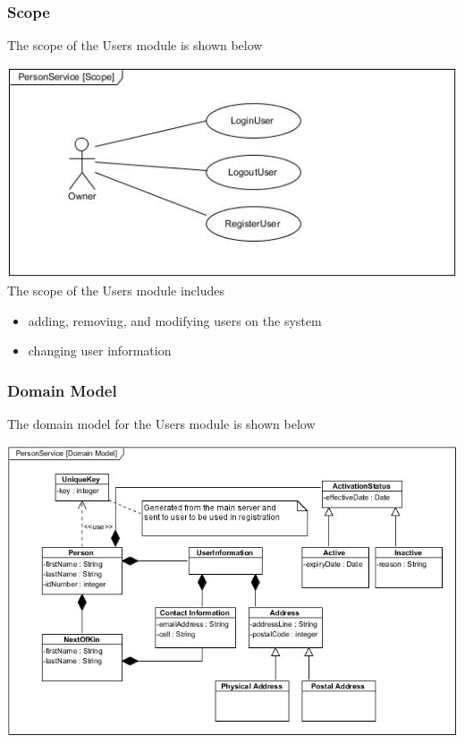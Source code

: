 \documentclass[a4paper,12pt]{article}
\begin{document}
	\subsubsection{Scope}
	The scope of the Users module is shown below
	
	\includegraphics[width=1\textwidth]{./Pictures/UML/Usecase/PersonServiceUseCase.jpg}\\[0cm]
	
	{\noindent}The scope of the Users module includes
	\begin{itemize}
		\item adding, removing, and modifying users on the system
		\item changing user information
	\end{itemize}
	
	\subsubsection{Domain Model}
	The domain model for the Users module is shown below
	
	\includegraphics[width=1\textwidth]{./Pictures/UML/PersonServiceDomain.jpg}\\[1.5cm]	
\end{document}
